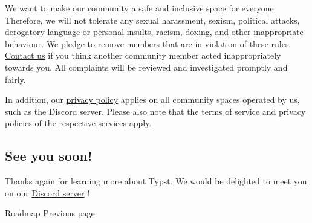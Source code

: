 We want to make our community a safe and inclusive space for everyone.
Therefore, we will not tolerate any sexual harassment, sexism, political
attacks, derogatory language or personal insults, racism, doxing, and
other inappropriate behaviour. We pledge to remove members that are in
violation of these rules. \href{https://typst.app/contact/}{Contact us}
if you think another community member acted inappropriately towards you.
All complaints will be reviewed and investigated promptly and fairly.

In addition, our \href{https://typst.app/privacy/}{privacy policy}
applies on all community spaces operated by us, such as the Discord
server. Please also note that the terms of service and privacy policies
of the respective services apply.

\subsection{See you soon!}\label{see-you}

Thanks again for learning more about Typst. We would be delighted to
meet you on our \href{https://discord.gg/2uDybryKPe}{Discord server} !

\href{/docs/roadmap/}{\pandocbounded{}}

{ Roadmap } { Previous page }
